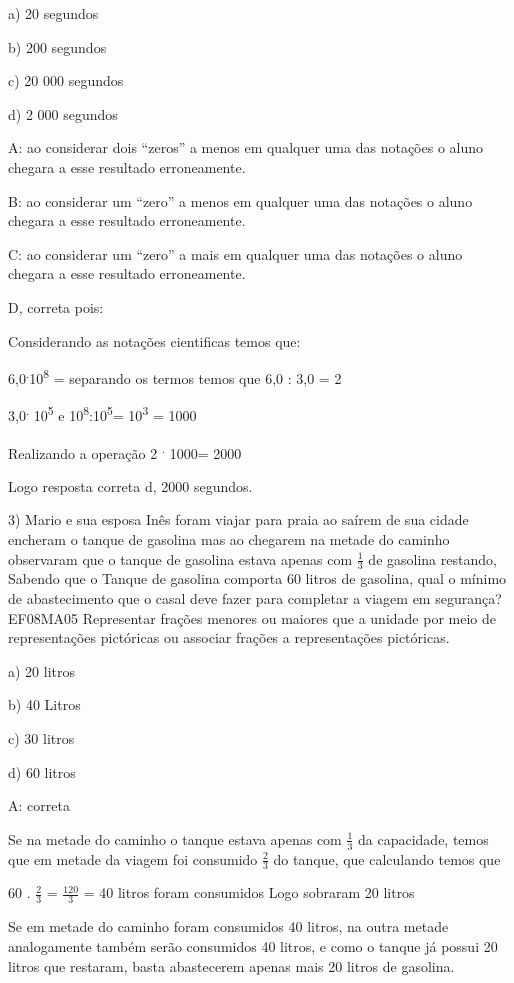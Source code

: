 a) 20 segundos

b) 200 segundos

c) 20 000 segundos

d) 2 000 segundos

A: ao considerar dois ``zeros'' a menos em qualquer uma das notações o
aluno chegara a esse resultado erroneamente.

B: ao considerar um ``zero'' a menos em qualquer uma das notações o
aluno chegara a esse resultado erroneamente.

C: ao considerar um ``zero'' a mais em qualquer uma das notações o aluno
chegara a esse resultado erroneamente.

D, correta pois:

Considerando as notações cientificas temos que:

6,0\textsuperscript{.}10\textsuperscript{8} = separando os termos temos
que 6,0 : 3,0 = 2

3,0\textsuperscript{.} 10\textsuperscript{5} e
10\textsuperscript{8}:10\textsuperscript{5}= 10\textsuperscript{3} =
1000

Realizando a operação 2 \textsuperscript{.} 1000= 2000

Logo resposta correta d, 2000 segundos.

3) Mario e sua esposa Inês foram viajar para praia ao saírem de sua
cidade encheram o tanque de gasolina mas ao chegarem na metade do
caminho observaram que o tanque de gasolina estava apenas com
\(\frac{1}{3}\) de gasolina restando, Sabendo que o Tanque de gasolina
comporta 60 litros de gasolina, qual o mínimo de abastecimento que o
casal deve fazer para completar a viagem em segurança? EF08MA05
Representar frações menores ou maiores que a unidade por meio de
representações pictóricas ou associar frações a representações
pictóricas.

a) 20 litros

b) 40 Litros

c) 30 litros

d) 60 litros

A: correta

Se na metade do caminho o tanque estava apenas com \(\frac{1}{3}\) da
capacidade, temos que em metade da viagem foi consumido \(\frac{2}{3}\)
do tanque, que calculando temos que

60 . \(\frac{2}{3}\) = \(\frac{120}{3}\) = 40 litros foram consumidos
Logo sobraram 20 litros

Se em metade do caminho foram consumidos 40 litros, na outra metade
analogamente também serão consumidos 40 litros, e como o tanque já
possui 20 litros que restaram, basta abastecerem apenas mais 20 litros
de gasolina.


